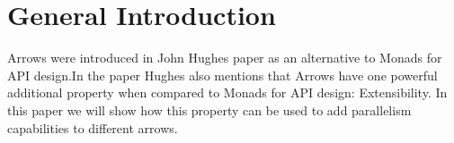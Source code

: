 \section{General Introduction}
Arrows were introduced in John Hughes paper as an alternative to Monads for API design.\citHughes In the paper Hughes also mentions that Arrows have one powerful additional property when compared to Monads for API design: Extensibility. In this paper we will show how this property can be used to add parallelism capabilities to different arrows.